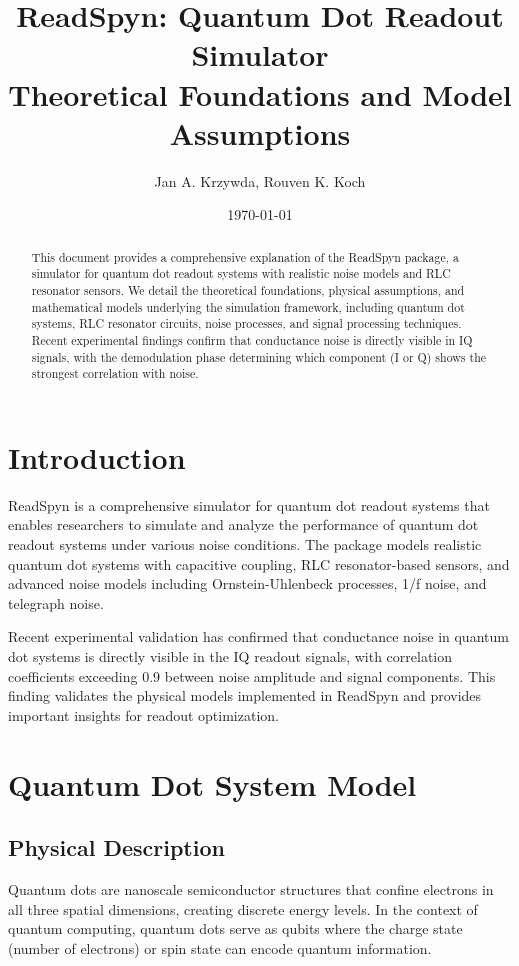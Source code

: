 \documentclass{article}
\title{ReadSpyn: Quantum Dot Readout Simulator\\
\large Theoretical Foundations and Model Assumptions}
\author{Jan A. Krzywda, Rouven K. Koch}
\date{\today}
\begin{document}
\maketitle

\begin{abstract}
This document provides a comprehensive explanation of the ReadSpyn package, a simulator for quantum dot readout systems with realistic noise models and RLC resonator sensors. We detail the theoretical foundations, physical assumptions, and mathematical models underlying the simulation framework, including quantum dot systems, RLC resonator circuits, noise processes, and signal processing techniques. Recent experimental findings confirm that conductance noise is directly visible in IQ signals, with the demodulation phase determining which component (I or Q) shows the strongest correlation with noise.
\end{abstract}

\tableofcontents
\newpage

\section{Introduction}

ReadSpyn is a comprehensive simulator for quantum dot readout systems that enables researchers to simulate and analyze the performance of quantum dot readout systems under various noise conditions. The package models realistic quantum dot systems with capacitive coupling, RLC resonator-based sensors, and advanced noise models including Ornstein-Uhlenbeck processes, 1/f noise, and telegraph noise.

Recent experimental validation has confirmed that conductance noise in quantum dot systems is directly visible in the IQ readout signals, with correlation coefficients exceeding 0.9 between noise amplitude and signal components. This finding validates the physical models implemented in ReadSpyn and provides important insights for readout optimization.

\section{Quantum Dot System Model}

\subsection{Physical Description}

Quantum dots are nanoscale semiconductor structures that confine electrons in all three spatial dimensions, creating discrete energy levels. In the context of quantum computing, quantum dots serve as qubits where the charge state (number of electrons) or spin state can encode quantum information.
\end{document}
